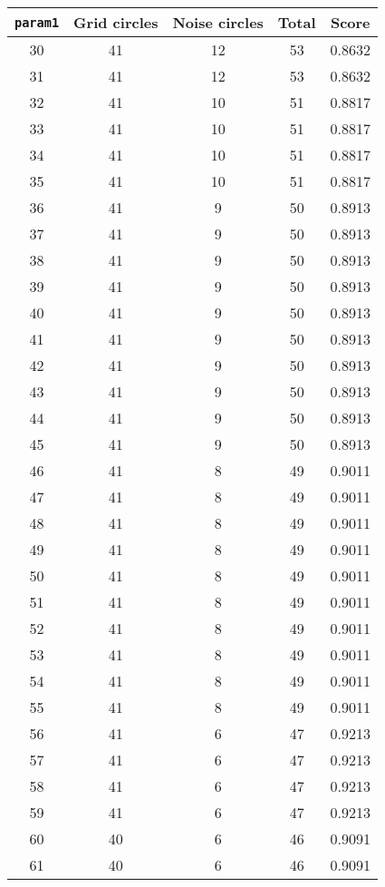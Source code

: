 \documentclass[letterpaper, 12pt]{article}
\begin{document}
\begin{longtable}{|c|c|c|c|c|}
\hline
\textbf{\texttt{param1}} & \textbf{Grid circles} & \textbf{Noise circles} & \textbf{Total} & \textbf{Score} \\
\hline
30 & 41 & 12 & 53 & 0.8632 \\
\hline
31 & 41 & 12 & 53 & 0.8632 \\
\hline
32 & 41 & 10 & 51 & 0.8817 \\
\hline
33 & 41 & 10 & 51 & 0.8817 \\
\hline
34 & 41 & 10 & 51 & 0.8817 \\
\hline
35 & 41 & 10 & 51 & 0.8817 \\
\hline
36 & 41 & 9 & 50 & 0.8913 \\
\hline
37 & 41 & 9 & 50 & 0.8913 \\
\hline
38 & 41 & 9 & 50 & 0.8913 \\
\hline
39 & 41 & 9 & 50 & 0.8913 \\
\hline
40 & 41 & 9 & 50 & 0.8913 \\
\hline
41 & 41 & 9 & 50 & 0.8913 \\
\hline
42 & 41 & 9 & 50 & 0.8913 \\
\hline
43 & 41 & 9 & 50 & 0.8913 \\
\hline
44 & 41 & 9 & 50 & 0.8913 \\
\hline
45 & 41 & 9 & 50 & 0.8913 \\
\hline
46 & 41 & 8 & 49 & 0.9011 \\
\hline
47 & 41 & 8 & 49 & 0.9011 \\
\hline
48 & 41 & 8 & 49 & 0.9011 \\
\hline
49 & 41 & 8 & 49 & 0.9011 \\
\hline
50 & 41 & 8 & 49 & 0.9011 \\
\hline
51 & 41 & 8 & 49 & 0.9011 \\
\hline
52 & 41 & 8 & 49 & 0.9011 \\
\hline
53 & 41 & 8 & 49 & 0.9011 \\
\hline
54 & 41 & 8 & 49 & 0.9011 \\
\hline
55 & 41 & 8 & 49 & 0.9011 \\
\hline
56 & 41 & 6 & 47 & 0.9213 \\
\hline
57 & 41 & 6 & 47 & 0.9213 \\
\hline
58 & 41 & 6 & 47 & 0.9213 \\
\hline
59 & 41 & 6 & 47 & 0.9213 \\
\hline
60 & 40 & 6 & 46 & 0.9091 \\
\hline
61 & 40 & 6 & 46 & 0.9091 \\

\end{longtable}
\end{document}
